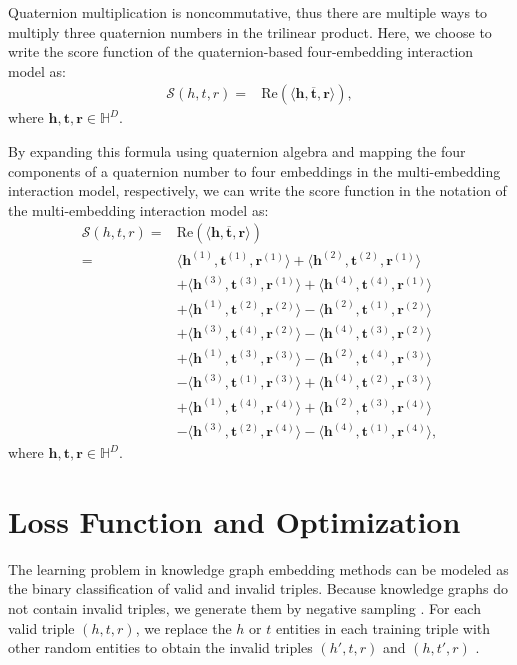 \documentclass[sigconf,edbt]{acmart-edbt2019}
\def\vh{{\bm{h}}}
\def\vr{{\bm{r}}}
\def\vt{{\bm{t}}}
\def\gS{{\mathcal{S}}}
\def\sH{{\mathbb{H}}}
\begin{document}
Quaternion multiplication is noncommutative, thus there are multiple ways to multiply three quaternion numbers in the trilinear product. Here, we choose to write the score function of the quaternion-based four-embedding interaction model as:
\begin{equation} \label{eq:quaternion}
\begin{split}
\gS(h,t,r) = &\text{Re}(\langle \vh, \overline{\vt}, \vr \rangle),
\end{split}
\end{equation}
where $ \vh, \vt, \vr \in \sH^{D} $.

By expanding this formula using quaternion algebra \cite{kantor_hypercomplexnumberselementary_1989} and mapping the four components of a quaternion number to four embeddings in the multi-embedding interaction model, respectively, we can write the score function in the notation of the multi-embedding interaction model as:
\begin{equation} \label{eq:quaternion_expand}
\begin{split}
\gS(h,t,r) = &\text{Re}(\langle \vh, \overline{\vt}, \vr \rangle)\\
= &\langle \vh^{(1)}, \vt^{(1)}, \vr^{(1)} \rangle + \langle \vh^{(2)}, \vt^{(2)}, \vr^{(1)} \rangle\\
&+ \langle \vh^{(3)}, \vt^{(3)}, \vr^{(1)} \rangle + \langle \vh^{(4)}, \vt^{(4)}, \vr^{(1)} \rangle\\
&+ \langle \vh^{(1)}, \vt^{(2)}, \vr^{(2)} \rangle - \langle \vh^{(2)}, \vt^{(1)}, \vr^{(2)} \rangle\\
&+ \langle \vh^{(3)}, \vt^{(4)}, \vr^{(2)} \rangle - \langle \vh^{(4)}, \vt^{(3)}, \vr^{(2)} \rangle\\
&+ \langle \vh^{(1)}, \vt^{(3)}, \vr^{(3)} \rangle - \langle \vh^{(2)}, \vt^{(4)}, \vr^{(3)} \rangle\\
&- \langle \vh^{(3)}, \vt^{(1)}, \vr^{(3)} \rangle + \langle \vh^{(4)}, \vt^{(2)}, \vr^{(3)} \rangle\\
&+ \langle \vh^{(1)}, \vt^{(4)}, \vr^{(4)} \rangle + \langle \vh^{(2)}, \vt^{(3)}, \vr^{(4)} \rangle\\
&- \langle \vh^{(3)}, \vt^{(2)}, \vr^{(4)} \rangle - \langle \vh^{(4)}, \vt^{(1)}, \vr^{(4)} \rangle,
\end{split}
\end{equation}
where $ \vh, \vt, \vr \in \sH^{D} $.


\section{Loss Function and Optimization}
The learning problem in knowledge graph embedding methods can be modeled as the binary classification of valid and invalid triples. Because knowledge graphs do not contain invalid triples, we generate them by negative sampling \cite{mikolov_efficientestimationword_2013}. For each valid triple $ (h, t, r) $, we replace the $ h $ or $ t $ entities in each training triple with other random entities to obtain the invalid triples $ (h', t, r) $ and $ (h, t', r) $ \cite{bordes_translatingembeddingsmodeling_2013}. 
\end{document}
